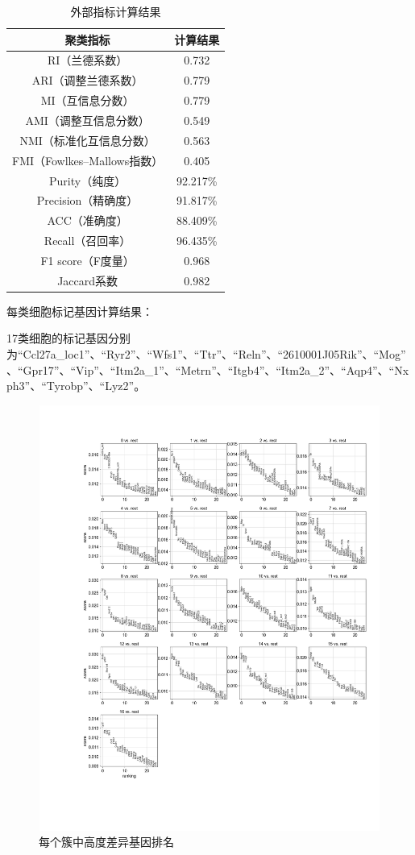 \documentclass {article}
\begin{document}
	\begin{table}[H]
		\centering
		\caption{外部指标计算结果}
		\begin{tabular}{cc}
			\hline
			聚类指标 & 计算结果 \\
			\hline
			RI（兰德系数） & 0.732 \\
			ARI（调整兰德系数） & 0.779 \\
			MI（互信息分数） & 0.779 \\
			AMI（调整互信息分数） & 0.549 \\
			NMI（标准化互信息分数） & 0.563 \\
			FMI（Fowlkes–Mallows指数） & 0.405 \\
			Purity（纯度） & 92.217\% \\
			Precision（精确度） & 91.817\% \\
			ACC（准确度） & 88.409\% \\
			Recall（召回率） & 96.435\% \\
			F1 score（F度量） & 0.968 \\
			Jaccard系数 & 0.982 \\
			\hline                                                                               
		\end{tabular}
	\end{table}
	
	每类细胞标记基因计算结果：
	
	17类细胞的标记基因分别为``Ccl27a\_loc1''、``Ryr2''、``Wfs1''、``Ttr''、``Reln''、``2610001J05Rik''、``Mog''、``Gpr17''、``Vip''、``Itm2a\_1''、``Metrn''、``Itgb4''、``Itm2a\_2''、``Aqp4''、``Nxph3''、``Tyrobp''、``Lyz2''。
	\begin{figure}[H]
		\centering
		\includegraphics[width=4.5in,height=5.5in]{figures/fig4.png}
		\caption{每个簇中高度差异基因排名}
	\end{figure}
	
\end{document}
